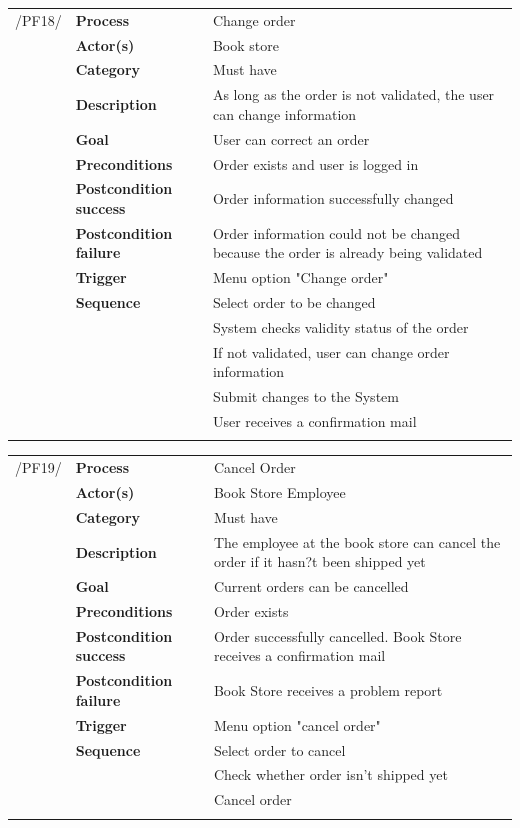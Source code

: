 \documentclass[11pt,a4paper,oneside,svgnames]{report}
\begin{document}
\noindent
\begin{tabular}{p{1.5cm}p{3cm}p{8cm}}
/PF18/	& \textbf{Process} & Change order\\
		& \textbf{Actor(s)} & Book store\\
		& \textbf{Category} & Must have\\
		& \textbf{Description}	 & As long as the order is not validated, the user can change information\\
		& \textbf{Goal} & User can correct an order\\
		& \textbf{Preconditions} & Order exists and user is logged in\\
		& \textbf{Postcondition success} & Order information successfully changed\\
		& \textbf{Postcondition failure} & Order information could not be changed because the order is already being validated\\
		& \textbf{Trigger} & Menu option "Change order"\\
		& \textbf{Sequence} & Select order to be changed\\
		& & System checks validity status of the order\\
		& & If not validated, user can change order information\\
		& & Submit changes to the System\\
		& & User receives a confirmation mail\\
		
\hfill \\
\end{tabular}

\noindent
\begin{tabular}{p{1.5cm}p{3cm}p{8cm}}
/PF19/	& \textbf{Process} & Cancel Order\\
		& \textbf{Actor(s)} & Book Store Employee\\
		& \textbf{Category} & Must have\\
		& \textbf{Description}	 & The employee at the book store can cancel the order if it hasn?t been shipped yet\\
		& \textbf{Goal} & Current orders can be cancelled\\
		& \textbf{Preconditions} & Order exists\\
		& \textbf{Postcondition success} & Order successfully cancelled. Book Store receives a confirmation mail\\
		& \textbf{Postcondition failure} & Book Store receives a problem report\\
		& \textbf{Trigger} & Menu option "cancel order"\\
		& \textbf{Sequence} & Select order to cancel\\
		& & Check whether order isn't shipped yet\\
		& & Cancel order\\
		
\hfill \\
\end{tabular}
\end{document}
